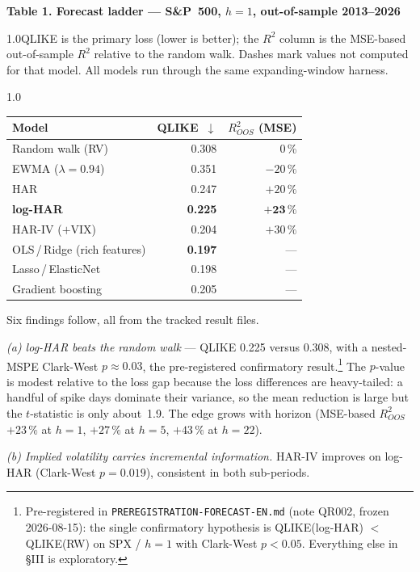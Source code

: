 \documentclass[12pt,a4paper]{article}
\newcommand{\tnote}[1]{\par\vspace{1.2ex}\begin{spacing}{1.0}\small\noindent #1\par\end{spacing}\vspace{1.2ex}}
\newcommand{\cf}[1]{\footnote{#1}}
\begin{document}
\begin{table}[t]\centering
\textbf{Table 1. Forecast ladder --- S\&P~500, $h=1$, out-of-sample 2013--2026}
\tnote{QLIKE is the primary loss (lower is better); the $R^2$ column is the MSE-based out-of-sample
$R^2$ relative to the random walk. Dashes mark values not computed for that model. All models run
through the same expanding-window harness.}
\begin{spacing}{1.0}
\begin{tabular}{lrr}
\toprule
Model & QLIKE~$\downarrow$ & $R^2_{OOS}$ (MSE) \\
\midrule
Random walk (RV)              & 0.308 & \phantom{$+$}0\,\% \\
EWMA ($\lambda=0.94$)         & 0.351 & $-20\,\%$ \\
HAR                           & 0.247 & $+20\,\%$ \\
\textbf{log-HAR}              & \textbf{0.225} & $\mathbf{+23\,\%}$ \\
HAR-IV ($+$VIX)               & 0.204 & $+30\,\%$ \\
OLS\,/\,Ridge (rich features) & \textbf{0.197} & --- \\
Lasso\,/\,ElasticNet          & 0.198 & --- \\
Gradient boosting             & 0.205 & --- \\
\bottomrule
\end{tabular}
\end{spacing}
\label{tab:ladder}
\end{table}

Six findings follow, all from the tracked result files.

\emph{(a) log-HAR beats the random walk} --- QLIKE 0.225 versus 0.308, with a nested-MSPE Clark-West
$p\approx0.03$, the pre-registered confirmatory result.\cf{Pre-registered in
\texttt{PREREGISTRATION-FORECAST-EN.md} (note QR002, frozen 2026-08-15): the single
confirmatory hypothesis is QLIKE(log-HAR) $<$ QLIKE(RW) on SPX / $h{=}1$ with Clark-West $p<0.05$.
Everything else in §III is exploratory.} The $p$-value is modest relative to the loss
gap because the loss differences are heavy-tailed: a handful of spike days dominate their variance,
so the mean reduction is large but the $t$-statistic is only about~1.9. The edge grows with horizon
(MSE-based $R^2_{OOS}$ $+23\,\%$ at $h{=}1$, $+27\,\%$ at $h{=}5$, $+43\,\%$ at $h{=}22$).

\emph{(b) Implied volatility carries incremental information.} HAR-IV improves on log-HAR
(Clark-West $p=0.019$), consistent in both sub-periods.
\end{document}
